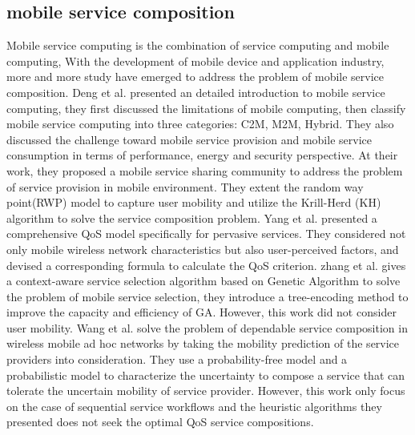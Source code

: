 \documentclass[10pt,journal,compsoc]{IEEEtran}
\begin{document}
\subsection{mobile service composition}
Mobile service computing is the combination of service computing and mobile computing, With the development of mobile device and application industry, more and more study have emerged to address the problem of mobile service composition. 
Deng et al. \cite{Deng2016} presented an detailed introduction to mobile service computing, they first discussed the limitations of mobile computing, then classify mobile service computing into three categories: C2M, M2M, Hybrid. They also discussed the challenge toward mobile service provision and mobile service consumption in terms of performance, energy and security perspective. At their \cite{Deng2017} work, they proposed a mobile service sharing community to address the problem of service provision in mobile environment. They extent the random way point(RWP) model to capture user mobility and utilize the Krill-Herd (KH) algorithm to solve the service composition problem. Yang et al. \cite{Yang2010} presented a comprehensive QoS model specifically for pervasive services. They considered not only mobile wireless network characteristics but also user-perceived factors, and devised a corresponding formula to calculate the QoS criterion. 
zhang et al. \cite{Zhang2016} gives a context-aware service selection algorithm based on Genetic Algorithm to solve the problem of mobile service selection, they introduce a tree-encoding method to improve the capacity and efficiency of GA. However, this work did not consider user mobility.
Wang et al. \cite{wang2011exploiting} solve the problem of dependable service composition in wireless mobile ad hoc networks by taking the mobility prediction of the service providers into consideration.
They use a probability-free model and a probabilistic model to characterize the uncertainty to compose a service that can tolerate the uncertain mobility of service provider. However, this work only focus on the case of sequential service workflows and the heuristic algorithms they presented does not seek the optimal QoS service compositions.
\end{document}
